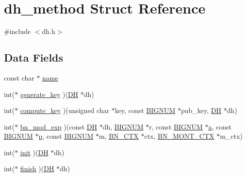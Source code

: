 \hypertarget{structdh__method}{}\section{dh\+\_\+method Struct Reference}
\label{structdh__method}


{\ttfamily \#include $<$dh.\+h$>$}

\subsection*{Data Fields}
\begin{DoxyCompactItemize}
\item 
const char $\ast$ \hyperlink{structdh__method_afcd1706c9144e6d6eee6127661ae3be2}{name}
\item 
int($\ast$ \hyperlink{structdh__method_a83c666d38c8c8d7056d76941684b09e7}{generate\+\_\+key} )(\hyperlink{crypto_2ossl__typ_8h_a5a5072cfe75a51d0ff201c0a8d2d68b2}{DH} $\ast$dh)
\item 
int($\ast$ \hyperlink{structdh__method_a5ec155f24c6ba97c5321635a5047639c}{compute\+\_\+key} )(unsigned char $\ast$key, const \hyperlink{crypto_2ossl__typ_8h_a6fb19728907ec6515e4bfb716bffa141}{B\+I\+G\+N\+UM} $\ast$pub\+\_\+key, \hyperlink{crypto_2ossl__typ_8h_a5a5072cfe75a51d0ff201c0a8d2d68b2}{DH} $\ast$dh)
\item 
int($\ast$ \hyperlink{structdh__method_a5808ab211d6e6f99f92b2d9bd2f0ccdc}{bn\+\_\+mod\+\_\+exp} )(const \hyperlink{crypto_2ossl__typ_8h_a5a5072cfe75a51d0ff201c0a8d2d68b2}{DH} $\ast$dh, \hyperlink{crypto_2ossl__typ_8h_a6fb19728907ec6515e4bfb716bffa141}{B\+I\+G\+N\+UM} $\ast$r, const \hyperlink{crypto_2ossl__typ_8h_a6fb19728907ec6515e4bfb716bffa141}{B\+I\+G\+N\+UM} $\ast$\hyperlink{hpux_8cc_af3e37283d97a42ffc096d8958a745f32}{a}, const \hyperlink{crypto_2ossl__typ_8h_a6fb19728907ec6515e4bfb716bffa141}{B\+I\+G\+N\+UM} $\ast$\hyperlink{ssl__locl_8h_a4014c6f4a6fa0e565ca592bcaca0fa58}{p}, const \hyperlink{crypto_2ossl__typ_8h_a6fb19728907ec6515e4bfb716bffa141}{B\+I\+G\+N\+UM} $\ast$m, \hyperlink{crypto_2ossl__typ_8h_a0b235a35b7dd7922c097571ecd90e2bc}{B\+N\+\_\+\+C\+TX} $\ast$ctx, \hyperlink{crypto_2ossl__typ_8h_aec902d353e00ced6d3fee6cd033a8bd0}{B\+N\+\_\+\+M\+O\+N\+T\+\_\+\+C\+TX} $\ast$m\+\_\+ctx)
\item 
int($\ast$ \hyperlink{structdh__method_a1da5c3afff89934c575378b52e64c136}{init} )(\hyperlink{crypto_2ossl__typ_8h_a5a5072cfe75a51d0ff201c0a8d2d68b2}{DH} $\ast$dh)
\item 
int($\ast$ \hyperlink{structdh__method_a3bca2ee547b69b6ced51009756d71cb0}{finish} )(\hyperlink{crypto_2ossl__typ_8h_a5a5072cfe75a51d0ff201c0a8d2d68b2}{DH} $\ast$dh)

\end{DoxyCompactItemize}
